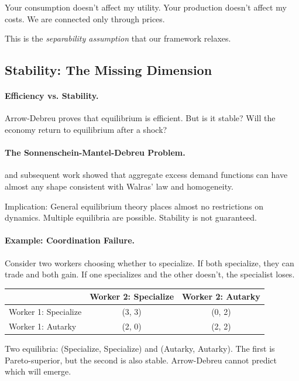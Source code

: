 \documentclass[12pt,a4paper]{article}
\begin{document}
Your consumption doesn't affect my utility.
Your production doesn't affect my costs.
We are connected only through prices.

This is the \emph{separability assumption} that our framework relaxes.

\subsection{Stability: The Missing Dimension}

\paragraph{Efficiency vs. Stability.}
Arrow-Debreu proves that equilibrium is efficient.
But is it stable? Will the economy return to equilibrium after a shock?

\paragraph{The Sonnenschein-Mantel-Debreu Problem.}
\citet{sonnenschein1972} and subsequent work showed that
aggregate excess demand functions can have almost any shape
consistent with Walras' law and homogeneity.

Implication: General equilibrium theory places almost no restrictions on dynamics.
Multiple equilibria are possible. Stability is not guaranteed.

\paragraph{Example: Coordination Failure.}
Consider two workers choosing whether to specialize.
If both specialize, they can trade and both gain.
If one specializes and the other doesn't, the specialist loses.

\begin{center}
\renewcommand{\arraystretch}{1.2}
\begin{tabular}{l|cc}
 & Worker 2: Specialize & Worker 2: Autarky \\
\hline
Worker 1: Specialize & (3, 3) & (0, 2) \\
Worker 1: Autarky & (2, 0) & (2, 2) \\
\end{tabular}
\end{center}

Two equilibria: (Specialize, Specialize) and (Autarky, Autarky).
The first is Pareto-superior, but the second is also stable.
Arrow-Debreu cannot predict which will emerge.
\end{document}
